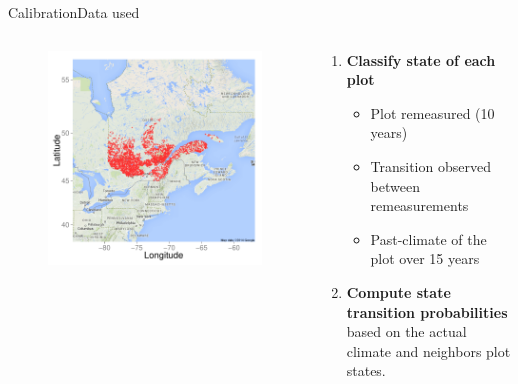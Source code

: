 \documentclass[10pt,aspectratio=149]{beamer}
\begin{document}
\begin{frame}{Calibration}{Data used}
	
	\begin{columns}[c]
	\begin{column}[c]{.45\paperwidth}
		\begin{figure}
			\includegraphics[width=.45\paperwidth]{Figs/carto.pdf}
		\end{figure}
	\end{column}
	\begin{column}[l]{.50\paperwidth}

	\begin{enumerate}
			\item \textbf{Classify state of each plot}
		\begin{itemize}
			\item Plot remeasured (10 years)
			\item Transition observed between remeasurements
			\item Past-climate of the plot over 15 years
		\end{itemize}
			\item \textbf{Compute state transition probabilities} based on the actual climate and neighbors plot states.
	\end{enumerate}

	\end{column}
\end{columns}

\end{frame}
\end{document}
